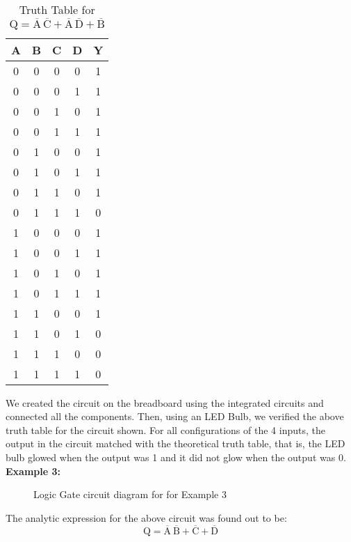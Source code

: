 \documentclass{scrartcl}
\begin{document}
\begin{table}[H]
    \centering
    \caption{Truth Table for \( \mathrm{Q} = \mathrm{\overline{A}\,\overline{C} + \overline{A}\,\overline{D} + \overline{B}} \)}
    \vspace{0.2cm}
    \begin{tabular}{|c|c|c|c||c|}
    \hline
    \textbf{A} & \textbf{B} & \textbf{C} & \textbf{D} & \textbf{Y} \\
    \hline
    0 & 0 & 0 & 0 & 1 \\
    0 & 0 & 0 & 1 & 1 \\
    0 & 0 & 1 & 0 & 1 \\
    0 & 0 & 1 & 1 & 1 \\
    0 & 1 & 0 & 0 & 1 \\
    0 & 1 & 0 & 1 & 1 \\
    0 & 1 & 1 & 0 & 1 \\
    0 & 1 & 1 & 1 & 0 \\
    1 & 0 & 0 & 0 & 1 \\
    1 & 0 & 0 & 1 & 1 \\
    1 & 0 & 1 & 0 & 1 \\
    1 & 0 & 1 & 1 & 1 \\
    1 & 1 & 0 & 0 & 1 \\
    1 & 1 & 0 & 1 & 0 \\
    1 & 1 & 1 & 0 & 0 \\
    1 & 1 & 1 & 1 & 0 \\
    \hline
    \end{tabular}
    \end{table}
    \noindent
    We created the circuit on the breadboard using the integrated circuits and connected all the components. Then, using an LED Bulb, we verified the above truth table for the circuit shown. For all configurations of the 4 inputs, the output in the circuit matched with the theoretical truth table, that is, the LED bulb glowed when the output was 1 and it did not glow when the output was 0. \\[0.2cm]
    \textbf{Example 3:}  
\begin{figure}[H]
    \centering
    
    \caption{Logic Gate circuit diagram for for Example 3}
\end{figure}
The analytic expression for the above circuit was found out to be: 
$$\mathrm{Q = \overline{A}\ \overline{B}+ \overline{C} + \overline{D}}$$
\end{document}
